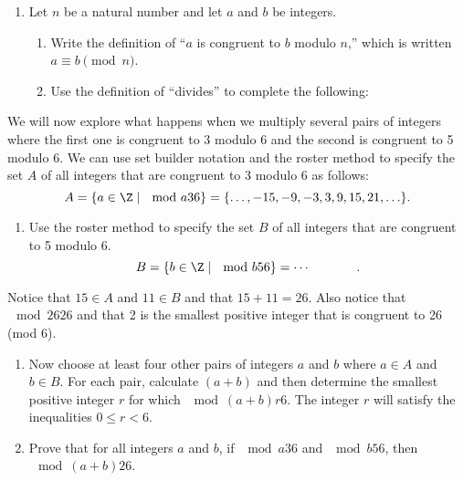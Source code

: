 \begin{previewactivity}\label{PA:congruencereview} \hfill 
\begin{enumerate}
\item Let $n$ be a natural number and let $a$ and $b$ be integers.
\begin{enumerate}
\item Write the definition of ``$a$ is congruent to $b$ modulo $n$,'' which is written 
$a \equiv b \pmod n$.

\item Use the definition of ``divides'' to complete the following:

\end{enumerate}
\end{enumerate}
We will now explore what happens when we multiply several pairs of integers where the first one is congruent to 3 modulo 6 and the second is congruent to 5 modulo 6.  We can use set builder notation and the roster method to specify the set 
$A$ of all integers that are congruent to 3 modulo 6 as follows:
\[
A = \left\{ a \in \Z \mid \mod{a}{3}{6} \right\} = \{ \ldots, -15, -9, -3, 3, 9, 15, 21, \ldots \}.
\]
\setcounter{oldenumi}{\theenumi}
\begin{enumerate} \setcounter{enumi}{\theoldenumi}
\item Use the roster method to specify the set $B$ of all integers that are congruent to 5 modulo 6.
\[
B = \left\{ b \in \Z \mid \mod{b}{5}{6} \right\} = \cdots \hspace{36pt}.
\]
\end{enumerate}
Notice that $15 \in A$ and $11 \in B$ and that $15 + 11 = 26$.  Also notice that $\mod{26}{2}{6}$ and that 2 is the smallest positive integer that is congruent to 26 (mod 6).
\setcounter{oldenumi}{\theenumi}
\begin{enumerate} \setcounter{enumi}{\theoldenumi}
\item Now choose at least four other pairs of integers $a$ and $b$ where $a \in A$ and $b \in B$.  For each pair, calculate $(a + b)$ and then determine the smallest positive integer $r$ for which 
$\mod{(a + b)}{r}{6}$.  \note The integer $r$ will satisfy the inequalities $0 \leq r < 6$.

\item Prove that for all integers $a$ and $b$, if $\mod{a}{3}{6}$ and $\mod{b}{5}{6}$, then 
$\mod{(a + b)}{2}{6}$.
\end{enumerate}
\end{previewactivity}
\hbreak

